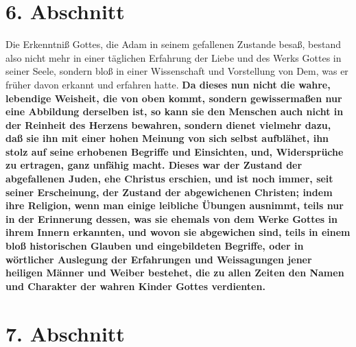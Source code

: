 \section{6. Abschnitt} \label{kap7_ab6}

Die Erkenntniß Gottes, die Adam in seinem gefallenen Zustande besaß, bestand
also nicht mehr in einer täglichen Erfahrung der Liebe und des Werks Gottes in
seiner Seele, sondern bloß in einer Wissenschaft und Vorstellung von Dem, was er
früher davon erkannt und erfahren hatte. \textbf{Da dieses nun nicht die wahre,
lebendige Weisheit, die von oben kommt, sondern gewissermaßen nur eine Abbildung
derselben ist, so kann sie den Menschen auch nicht in der Reinheit des Herzens
bewahren, sondern dienet vielmehr dazu, daß sie ihn mit einer hohen Meinung von
sich selbst aufblähet, ihn stolz auf seine erhobenen Begriffe und Einsichten, und, Widersprüche zu ertragen, ganz unfähig macht. Dieses war der Zustand der
abgefallenen Juden, ehe Christus erschien, und ist noch immer, seit seiner
Erscheinung, der Zustand der abgewichenen Christen; indem ihre Religion, wenn
man einige leibliche Übungen ausnimmt, teils nur in der Erinnerung dessen, was
sie ehemals von dem Werke Gottes in ihrem Innern erkannten, und wovon sie
abgewichen sind, teils in einem bloß historischen Glauben und eingebildeten
Begriffe, oder in wörtlicher Auslegung der Erfahrungen und Weissagungen jener
heiligen Männer und Weiber bestehet, die zu allen Zeiten den Namen und Charakter
der wahren Kinder Gottes verdienten.}

\section{7. Abschnitt} \label{kap7_ab7}

